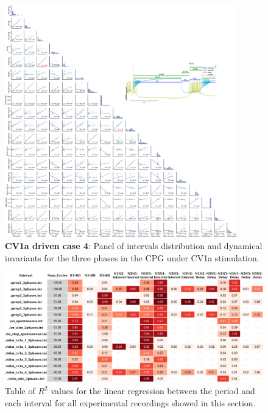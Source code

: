 %

\begin{figure}[htbp]
	\centering
	\includegraphics[width=0.9\textwidth]{./img/invariants/data/SUSSEX/CV1a_driven4/images/3phases/panel_with_pairplot.pdf}
	\caption{\textbf{CV1a driven case 4}: Panel of intervals distribution and dynamical invariants for the three phases in the CPG under CV1a stimulation.}
	\label{fig:cv1a 4 3phases pairplot}
\end{figure}



\begin{figure}
	\includegraphics[width=\textwidth]{./img/invariants/styled_table_invariants_r-squared.pdf}
	\caption{Table of $R^2$ values for the linear regression between the period and each interval for all experimental recordings showed in this section.}
	\label{fig:R2 table}
\end{figure}
